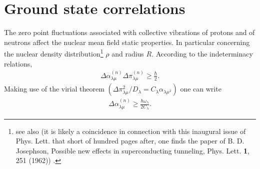 \documentclass[a4paper,11pt]{book}
\numberwithin{equation}{section}
\numberwithin{figure}{section}
\numberwithin{table}{section}
\begin{document}
\section{Ground state correlations}
The zero point fluctuations associated with collective vibrations of protons and of neutrons affect the nuclear mean field static properties. In particular concerning the nuclear density distribution\footnote{\cite{Gogny:78,Esbensen:83,Reinhard:79,Khodel:82,Barranco:87a} see also \cite{Brown:63,Anderson:62} (it is likely a coincidence in connection with this inaugural issue of Phys. Lett. that short of hundred pages after, one finds the paper of B. D. Josephson, Possible new effects in superconducting tunneling, Phys. Lett. \textbf{1}, 251 (1962)) .} $\rho$ and radius $R$. According to the indeterminacy relations,
\begin{align}\label{eq0.1.121}
\Delta\alpha_{\lambda\mu}^{(n)}\Delta\pi_{\lambda\mu}^{(n)}\geq\frac{\hbar}{2}.
\end{align}
Making use of the virial theorem $(\Delta\pi^2_{\lambda\mu}/D_\lambda=C_\lambda\alpha_{\lambda\mu^2})$ one can write
\begin{align}\label{eq0.1.122}
\Delta\alpha_{\lambda\mu}^{(n)}\geq\frac{\hbar\omega_\lambda}{2C_\lambda}.
\end{align}
\end{document}
